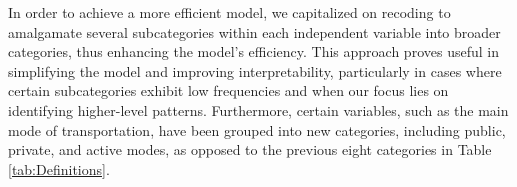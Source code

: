 \documentclass[
11pt, %
oneside, %
english, %
singlespacing, %
]{macthesis} %
\begin{document}
In order to achieve a more efficient model, we capitalized on recoding to amalgamate several subcategories within each independent variable into broader categories, thus enhancing the model's efficiency. This approach proves useful in simplifying the model and improving interpretability, particularly in cases where certain subcategories exhibit low frequencies and when our focus lies on identifying higher-level patterns. Furthermore, certain variables, such as the main mode of transportation, have been grouped into new categories, including public, private, and active modes, as opposed to the previous eight categories in Table \ref{tab:Definitions}.
\begin{table}

\caption{\label{tab:unnamed-chunk-23}\label{tab:Descriptive statistics of variables}Descriptive statistics of variables}
\centering
{}
\end{table}
\end{document}
